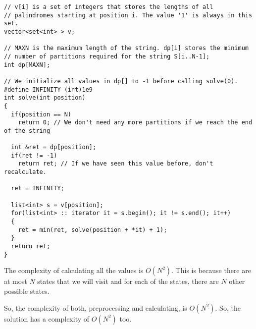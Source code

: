 \documentclass{article}
\begin{document}
\begin{verbatim}
// v[i] is a set of integers that stores the lengths of all 
// palindromes starting at position i. The value '1' is always in this set.
vector<set<int> > v; 

// MAXN is the maximum length of the string. dp[i] stores the minimum 
// number of partitions required for the string S[i..N-1];
int dp[MAXN]; 

// We initialize all values in dp[] to -1 before calling solve(0).
#define INFINITY (int)1e9
int solve(int position)
{
  if(position == N)
    return 0; // We don't need any more partitions if we reach the end of the string
	
  int &ret = dp[position];
  if(ret != -1)
    return ret; // If we have seen this value before, don't recalculate.
	
  ret = INFINITY;

  list<int> s = v[position];
  for(list<int> :: iterator it = s.begin(); it != s.end(); it++)
  {
    ret = min(ret, solve(position + *it) + 1);
  }
  return ret;
}
\end{verbatim}
The complexity of calculating all the values is $O(N^2)$. This is because there are at most $N$ states that we will visit and for each of the states, there are $N$ other possible states. 

So, the complexity of both, preprocessing and calculating, is $O(N^2)$. So, the solution has a complexity of $O(N^2)$ too. 

\clearpage
\end{document}
